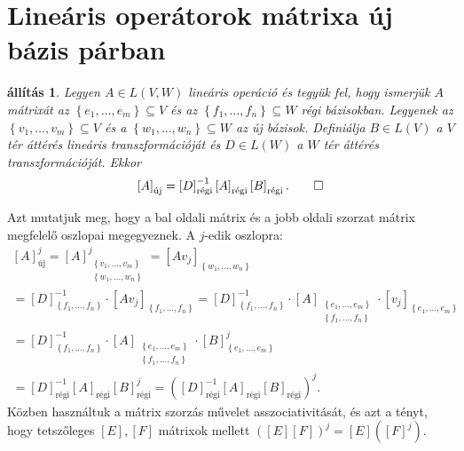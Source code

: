 \documentclass[9pt, a4paper, showtrims]{memoir}
\makeatletter
\renewenvironment{proof}[1][\proofname]
    {\par\pushQED{\qed}%
    \normalfont \topsep6\p@\@plus6\p@\relax
    \trivlist
    \item[\hskip\labelsep
        \itshape
    #1\@addpunct{:}]\ignorespaces}
    {\popQED\endtrivlist\@endpefalse}
\theoremstyle{plain}
\newtheorem{proposition}{állítás}[chapter]
\theoremstyle{remark}
\theoremstyle{definition}
\newcommand{\uj}{\text{új}}
\newcommand{\rgi}{\text{régi}}
\makeatother
\begin{document}
\section{Lineáris operátorok mátrixa új bázis párban}
\begin{proposition}
    Legyen $A\in L\left( V,W \right)$ lineáris operáció
    és tegyük fel, hogy ismerjük $A$ mátrixát az 
    $\left\{ e_1,\dots,e_m \right\}\subseteq V$ és az
    $\left\{ f_1,\dots,f_n \right\}\subseteq W$ régi bázisokban.
    Legyenek az $\left\{ v_1,\dots,v_m \right\}\subseteq V$
    és a $\left\{ w_1,\dots,w_n \right\}\subseteq W$ az új bázisok.
    Definiálja $B\in L\left( V \right)$ a $V$ tér áttérés lineáris transzformációját
    és $D\in L\left( W \right)$ a $W$ tér áttérés transzformációját.
    Ekkor 
    \[
        \left[ A \right]_{\uj}=
        \left[ D \right]_{\rgi}^{-1}\left[ A \right]_{\rgi}\left[ B \right]_{\rgi}.\qedhere
    \]
\end{proposition}
\begin{proof}
    Azt mutatjuk meg, hogy a bal oldali mátrix és a jobb oldali szorzat mátrix megfelelő oszlopai megegyeznek.
    A $j$-edik oszlopra:
    \begin{multline*}
        \left[ A \right]_{\uj}^j
        =
        \left[ A \right]_{\substack{\left\{ v_1,\dots,v_m \right\}\\ \left\{ w_1,\dots,w_n \right\}}}^j
        =
        \left[ Av_j \right]_{\left\{ w_1,\dots,w_n \right\}}
        \\
        =
        \left[ D \right]^{-1}_{\left\{ f_1,\dots,f_n \right\}}\cdot
        \left[ Av_j \right]_{\left\{ f_1,\dots,f_n \right\}}
        =
        \left[ D \right]^{-1}_{\left\{ f_1,\dots,f_n \right\}}\cdot
        \left[ A \right]_{\substack{\left\{ e_1,\dots,e_m \right\}\\ \left\{ f_1,\dots,f_n \right\}}}
        \cdot
        \left[ v_j \right]_{\left\{ e_1,\dots,e_m \right\}}
        \\
        =
        \left[ D \right]^{-1}_{\left\{ f_1,\dots,f_n \right\}}\cdot
        \left[ A \right]_{\substack{\left\{ e_1,\dots,e_m \right\}\\ \left\{ f_1,\dots,f_n \right\}}}
        \cdot
        \left[ B \right]_{\left\{ e_1,\dots,e_m \right\}}^j
        \\
        =
        \left[ D \right]_\rgi^{-1}
        \left[ A \right]_\rgi
        \left[ B \right]_\rgi^j
        =
        \left( \left[ D \right]^{-1}_\rgi\left[ A \right]_\rgi\left[ B \right]_\rgi \right)^j.
    \end{multline*}
    Közben használtuk a mátrix szorzás művelet asszociativitását,
    és azt a tényt, 
    hogy tetszőleges $\left[ E \right],\left[ F \right]$ mátrixok mellett
    $\left( \left[ E \right]\left[ F \right] \right)^j=\left[ E \right]\left( \left[F  \right]^j \right)$.
\end{proof}
\end{document}

